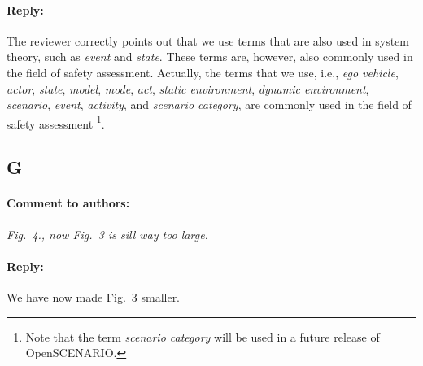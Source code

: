 \documentclass[10pt,final,a4paper,oneside,onecolumn]{article}
\newcommand{\toauthornew}{\paragraph*{Comment to authors:} \itshape}
\newcommand{\fromauthornew}{\paragraph*{Reply:} \normalfont}
\begin{document}
\fromauthornew The reviewer correctly points out that we use terms that are also used in system theory, such as \emph{event} and \emph{state}. These terms are, however, also commonly used in the field of safety assessment. Actually, the terms that we use, i.e., \emph{ego vehicle}, \emph{actor}, \emph{state}, \emph{model}, \emph{mode}, \emph{act}, \emph{static environment}, \emph{dynamic environment}, \emph{scenario}, \emph{event}, \emph{activity}, and \emph{scenario category}, are commonly used in the field of safety assessment \autocite{catapult2018musicc,catapult2018regulating,sigsim2019glossary,openscenario,ulbrich2015,geyer2014}\footnote{Note that the term \emph{scenario category} will be used in a future release of OpenSCENARIO.}.



\subsection*{G}

\toauthornew Fig.\ 4., now Fig.\ 3 is sill way too large. 

\fromauthornew We have now made Fig.\ 3 smaller.




\printbibliography
\end{document}
